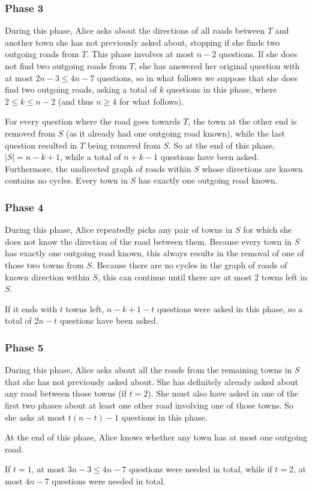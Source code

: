 \subsubsection*{Phase 3}
During this phase, Alice asks about the directions of all roads between $T$ and another town she has not previously asked about, stopping if she finds two outgoing roads from $T$. This phase involves at most $n - 2$ questions. If she does not find two outgoing roads from $T$, she has answered her original question with at most $2n - 3 \leq 4n - 7$ questions, so in what follows we suppose that she does find two outgoing roads, asking a total of $k$ questions in this phase, where $2 \leq k \leq n - 2$ (and thus $n \geq 4$ for what follows).

For every question where the road goes towards $T$, the town at the other end is removed from $S$ (as it already had one outgoing road known), while the last question resulted in $T$ being removed from $S$. So at the end of this phase, $|S| = n - k + 1$, while a total of $n + k - 1$ questions have been asked. Furthermore, the undirected graph of roads within $S$ whose directions are known contains no cycles. Every town in $S$ has exactly one outgoing road known.

\subsubsection*{Phase 4}
During this phase, Alice repeatedly picks any pair of towns in $S$ for which she does not know the direction of the road between them. Because every town in $S$ has exactly one outgoing road known, this always results in the removal of one of those two towns from $S$. Because there are no cycles in the graph of roads of known direction within $S$, this can continue until there are at most 2 towns left in $S$.

If it ends with $t$ towns left, $n - k + 1 - t$ questions were asked in this phase, so a total of $2n - t$ questions have been asked.

\subsubsection*{Phase 5}
During this phase, Alice asks about all the roads from the remaining towns in $S$ that she has not previously asked about. She has definitely already asked about any road between those towns (if $t = 2$). She must also have asked in one of the first two phases about at least one other road involving one of those towns. So she asks at most $t(n - t) - 1$ questions in this phase.

At the end of this phase, Alice knows whether any town has at most one outgoing road.

If $t = 1$, at most $3n - 3 \leq 4n - 7$ questions were needed in total, while if $t = 2$, at most $4n - 7$ questions were needed in total.


